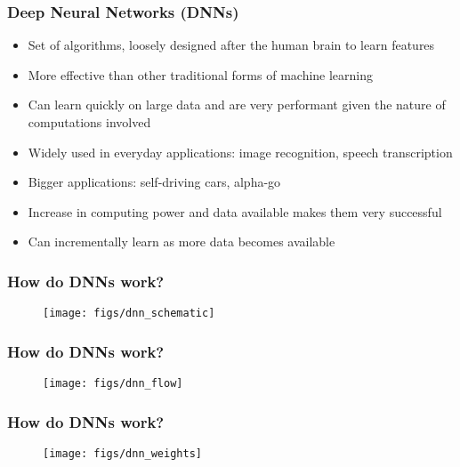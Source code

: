 \documentclass[aspectratio=169]{beamer}
\begin{document}
 \begin{frame}
     \frametitle{Deep Neural Networks (DNNs)}
     \begin{itemize}
         \item Set of algorithms, loosely designed after the human brain to learn features
         \item More effective than other traditional forms of machine learning
         \item Can learn quickly on large data and are very performant given the nature of computations involved
         \item Widely used in everyday applications: image recognition, speech transcription
         \item Bigger applications: self-driving cars, alpha-go
         \item Increase in computing power and data available makes them very successful
         \item Can incrementally learn as more data becomes available
     \end{itemize}
 \end{frame}
\begin{frame}
    \frametitle{How do DNNs work?}
    \begin{figure}
        \centering
        \texttt{[image: figs/dnn\_schematic]}
    \end{figure}
\end{frame}
\begin{frame}
    \frametitle{How do DNNs work?}
    \begin{figure}
        \centering
        \texttt{[image: figs/dnn\_flow]}
    \end{figure}
\end{frame}
\begin{frame}
    \frametitle{How do DNNs work?}
    \begin{figure}
        \centering
        \texttt{[image: figs/dnn\_weights]}
    \end{figure}
\end{frame}
\end{document}
